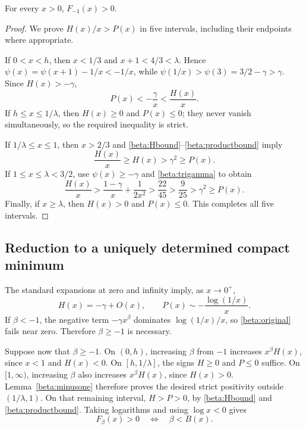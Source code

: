 \begin{lemma}\label{beta:minusone}
For every $x>0$, $F_{-1}(x)>0$.
\end{lemma}
\begin{proof}
We prove $H(x)/x>P(x)$ in five intervals, including their endpoints where
appropriate.

If $0<x<h$, then $x<1/3$ and $x+1<4/3<\lambda$. Hence
$\psi(x)=\psi(x+1)-1/x<-1/x$, while
$\psi(1/x)>\psi(3)=3/2-\gamma>\gamma$. Since $H(x)>-\gamma$,
\[
 P(x)<-\frac\gamma x<\frac{H(x)}x.
\]
If $h\leq x\leq1/\lambda$, then $H(x)\geq0$ and $P(x)\leq0$;
they never vanish simultaneously, so the required inequality is strict.

If $1/\lambda\leq x\leq1$, then $x>2/3$ and
\eqref{beta:Hbound}--\eqref{beta:productbound} imply
\[
 \frac{H(x)}x\geq H(x)>\gamma^2\geq P(x).
\]
If $1\leq x\leq\lambda<3/2$, use $\psi(x)\geq-\gamma$ and
\eqref{beta:trigamma} to obtain
\[
 \frac{H(x)}x>
 \frac{1-\gamma}{x}+\frac1{2x^2}
 >\frac{22}{45}>\frac9{25}>\gamma^2\geq P(x).
\]
Finally, if $x\geq\lambda$, then $H(x)>0$ and $P(x)\leq0$.
This completes all five intervals.
\end{proof}

\subsection{Reduction to a uniquely determined compact minimum}

The standard expansions at zero and infinity imply, as $x\to0^+$,
\begin{equation}\label{beta:asymptotics}
 H(x)=-\gamma+O(x),\qquad
 P(x)\sim-\frac{\log(1/x)}x.
\end{equation}
If $\beta<-1$, the negative term $-\gamma x^\beta$ dominates
$\log(1/x)/x$, so \eqref{beta:original} fails near zero. Therefore
$\beta\geq-1$ is necessary.

Suppose now that $\beta\geq-1$. On $(0,h)$, increasing $\beta$ from
$-1$ increases $x^\beta H(x)$, since $x<1$ and $H(x)<0$.
On $[h,1/\lambda]$, the signs $H\geq0$ and $P\leq0$ suffice.
On $[1,\infty)$, increasing $\beta$ also increases $x^\beta H(x)$,
since $H(x)>0$. Lemma~\ref{beta:minusone} therefore proves the desired
strict positivity outside $(1/\lambda,1)$.
On that remaining interval, $H>P>0$, by \eqref{beta:Hbound} and
\eqref{beta:productbound}. Taking logarithms and using $\log x<0$ gives
\begin{equation}\label{beta:compactreduction}
 F_\beta(x)>0\quad\Longleftrightarrow\quad\beta<B(x).
\end{equation}

